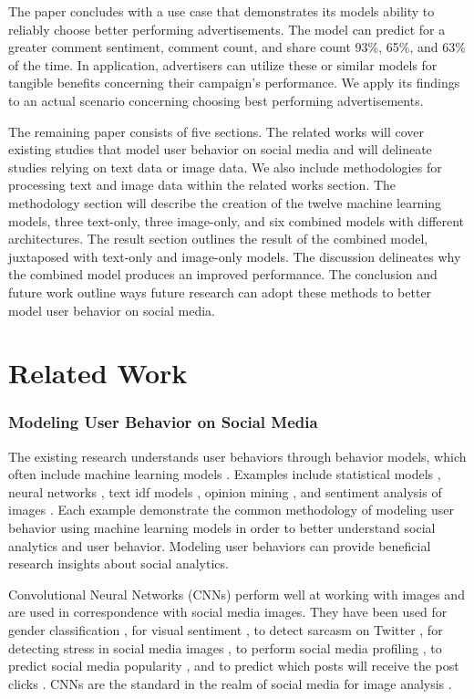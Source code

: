 \documentclass[mksc,blindrev]{informs3} %
\begin{document}
The paper concludes with a use case that demonstrates its models ability to reliably choose better performing advertisements. The model can predict for a greater comment sentiment, comment count, and share count 93\%, 65\%, and 63\% of the time. In application, advertisers can utilize these or similar models for tangible benefits concerning their campaign's performance. We apply its findings to an actual scenario concerning choosing best performing advertisements.

The remaining paper consists of five sections. The related works will cover existing studies that model user behavior on social media and will delineate studies relying on text data or image data. We also include methodologies for processing text and image data within the related works section. The methodology section will describe the creation of the twelve machine learning models, three text-only, three image-only, and six combined models with different architectures. The result section outlines the result of the combined model, juxtaposed with text-only and image-only models. The discussion delineates why the combined model produces an improved performance. The conclusion and future work outline ways future research can adopt these methods to better model user behavior on social media.

\section{Related Work}

\subsubsection{Modeling User Behavior on Social Media}

The existing research understands user behaviors through behavior models, which often include machine learning models \cite{Li2015, 8029313, Ohsawa2013, Liu2012, Li2015}.  Examples include statistical models \cite{Li2015}, neural networks \cite{8029313}, text idf models \cite{Ohsawa2013}, opinion mining \cite{Liu2012}, and sentiment analysis of images \cite{Wang2015}. Each  example demonstrate the common methodology of modeling user behavior using machine learning models in order to better understand social analytics and user behavior. Modeling user behaviors can provide beneficial research insights about social analytics.

Convolutional Neural Networks (CNNs) perform well at working with images and are used in correspondence with social media images. They have been used for gender classification \cite{Hassner2015}, for visual sentiment \cite{Segalin2017, Xu2014}, to detect sarcasm on Twitter \cite{Poria2016}, for detecting stress in social media images \cite{Lin2014}, to perform social media profiling \cite{Segalin2017}, to predict social media popularity \cite{Gelli2015}, and to predict which posts will receive the post clicks \cite{Khosla2014}. CNNs are the standard in the realm of social media for image analysis \cite{Hassner2015}. 
\end{document}
